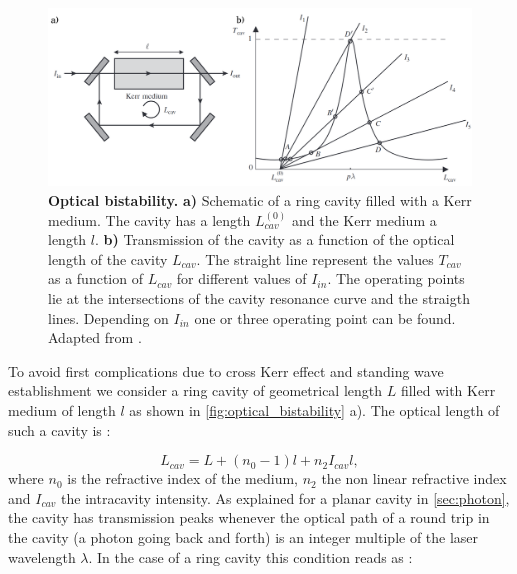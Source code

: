 \bigskip

\begin{figure}
    \centering
    \includegraphics[width=1\linewidth]{chap_theory/fig/bistability_grynberg.pdf}
    \caption{\textbf{Optical bistability.} \textbf{a)} Schematic of a ring cavity filled with a Kerr medium. The cavity has a length $L_{cav}^{(0)}$ and the Kerr medium a length $l$. \textbf{b)} Transmission of the cavity as a function of the optical length of the cavity $L_{cav}$. The straight line represent the values $T_{cav}$ as a function of $L_{cav}$ for different values of
    $I_{in}$. The operating points lie at the intersections of the cavity resonance curve and the straigth lines. Depending on $I_{in}$ one or three operating point can be found. Adapted from \cite{grynberg_aspect_fabre}.}
    \label{fig:optical_bistability}
\end{figure}

To avoid first complications due to cross Kerr effect and standing wave establishment we consider a ring cavity of geometrical length $L$ filled with Kerr medium of length $l$ as shown in \autoref{fig:optical_bistability} a). The optical length of
such a cavity is :

\begin{equation}
    L_{cav}= L+(n_0-1)l+n_2I_{cav}l,
    \label{eq:optical_length}
\end{equation}
where $n_0$ is the refractive index of the medium, $n_2$ the non linear refractive index and $I_{cav}$ the intracavity intensity.
As explained for a planar cavity in \autoref{sec:photon}, the cavity has transmission peaks whenever the optical path of a round trip in the cavity (a photon going back and forth) is an integer multiple of the laser wavelength $\lambda$.
In the case of a ring cavity this condition reads as :

